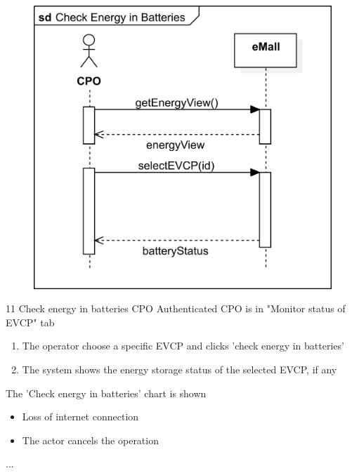 \usecase
{
    \begin{figure}[H]
        \centering
        \includegraphics[scale=0.9]{src/sequence_diagram/checkEnergy.png}
    \end{figure}
}
{11}
{Check energy in batteries} %
{CPO} %
{Authenticated CPO is in "Monitor status of EVCP" tab} %
{ %
    \begin{enumerate}
        \item The operator choose a specific EVCP and clicks 'check energy in batteries'
        \item The system shows the energy storage status of the selected EVCP, if any
    \end{enumerate}
}
{The 'Check energy in batteries' chart is shown} %
{ %
    \begin{itemize}
        \item Loss of internet connection
        \item The actor cancels the operation
    \end{itemize}
}
{ %
    ...
}

